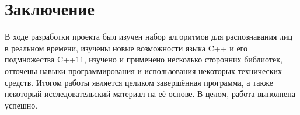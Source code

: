 \section*{Заключение} 

В ходе разработки проекта был изучен набор алгоритмов для распознавания лиц в
реальном времени, изучены новые возможности языка C++ и его подмножества C++11,
изучено и применено несколько сторонних библиотек, отточены навыки
программирования и использования некоторых технических средств. Итогом работы
является целиком завершённая программа, а также некоторый исследовательский
материал на её основе. В целом, работа выполнена успешно.


